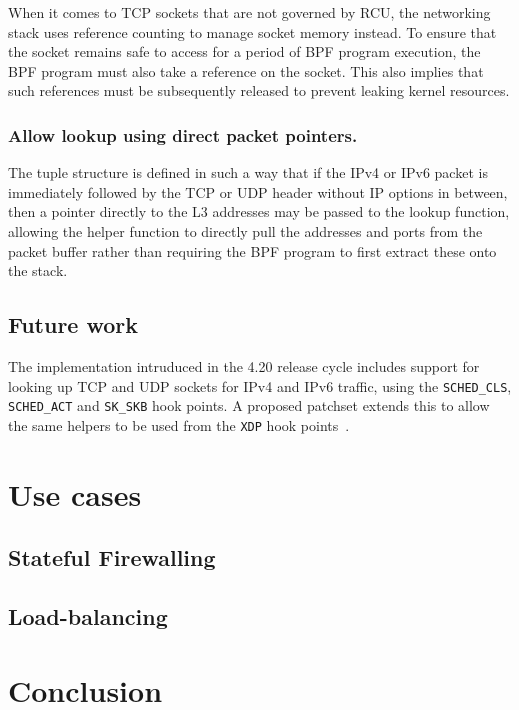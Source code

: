 \documentclass[10pt,sigconf,authorversion]{lpc}
\begin{document}
When it comes to TCP sockets that are not governed by RCU, the networking stack
uses reference counting to manage socket memory instead. To ensure that the
socket remains safe to access for a period of BPF program execution, the BPF
program must also take a reference on the socket. This also implies that such
references must be subsequently released to prevent leaking kernel resources.

\subsubsection{Allow lookup using direct packet pointers.}

The tuple structure is defined in such a way that if the IPv4 or IPv6 packet is
immediately followed by the TCP or UDP header without IP options in between,
then a pointer directly to the L3 addresses may be passed to the lookup
function, allowing the helper function to directly pull the addresses and ports
from the packet buffer rather than requiring the BPF program to first extract
these onto the stack.

\subsection{Future work}

The implementation intruduced in the 4.20 release cycle includes support for
looking up TCP and UDP sockets for IPv4 and IPv6 traffic, using the
\verb+SCHED_CLS+, \verb+SCHED_ACT+ and \verb+SK_SKB+ hook points. A proposed
patchset extends this to allow the same helpers to be used from the \verb+XDP+
hook points~\cite{sk-lookup-xdp}.

\section{Use cases}

\subsection{Stateful Firewalling}

\subsection{Load-balancing}

\section{Conclusion}
\end{document}

